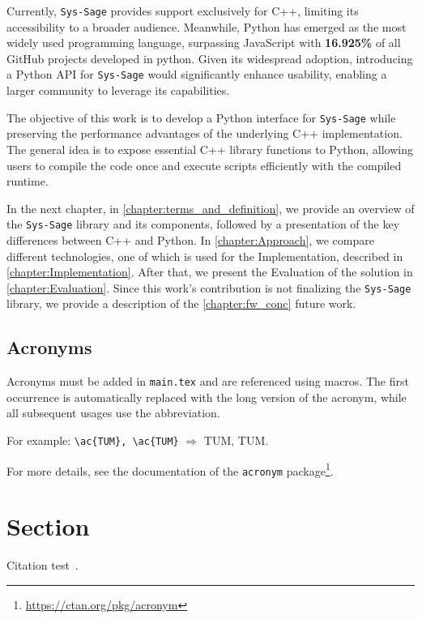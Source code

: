 Currently, \texttt{Sys-Sage} provides support exclusively for C++, limiting its accessibility to a broader audience. Meanwhile, Python has emerged as the most widely used programming language, surpassing JavaScript with \textbf{16.925\%} of all GitHub projects developed in python. Given its widespread adoption, introducing a Python \ac{API} for \texttt{Sys-Sage} would significantly enhance usability, enabling a larger community to leverage its capabilities. \cite{languages-github-stats}

The objective of this work is to develop a Python interface for \texttt{Sys-Sage} while preserving the performance advantages of the underlying C++ implementation. The general idea is to expose essential C++ library functions to Python, allowing users to compile the code once and execute scripts efficiently with the compiled runtime.

In the next chapter, in \autoref{chapter:terms_and_definition}, we provide an overview of the \texttt{Sys-Sage} library and its components, followed by a presentation of the key differences between C++ and Python.
In \autoref{chapter:Approach}, we compare different technologies, one of which is used for the Implementation, described in \autoref{chapter:Implementation}. After that, we present the Evaluation of the solution in \autoref{chapter:Evaluation}.
Since this work's contribution is not finalizing the \texttt{Sys-Sage} library, we provide a description of the \ref{chapter:fw_conc} future work.

\subsection{Acronyms}

Acronyms must be added in \texttt{main.tex} and are referenced using macros. The first occurrence is automatically replaced with the long version of the acronym, while all subsequent usages use the abbreviation.

For example: \texttt{\textbackslash ac\{TUM\}, \textbackslash ac\{TUM\}} $\Rightarrow$ \ac{TUM}, \ac{TUM}.

For more details, see the documentation of the \texttt{acronym} package\footnote{\url{https://ctan.org/pkg/acronym}}.


\section{Section}
Citation test~\parencite{latex}.


